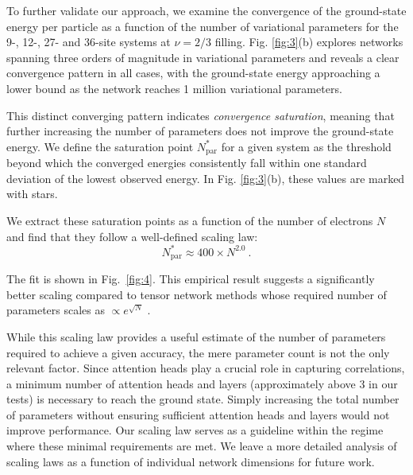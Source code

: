 \documentclass[
 reprint,
 amsmath,amssymb,
 aps, prx,
floatfix,longbibliography,
]{revtex4-2}
\begin{document}
To further validate our approach, we examine the convergence of the ground-state energy per particle as a function of the number of variational parameters for the 9-, 12-, 27- and 36-site systems at 
$\nu=2/3$ filling. Fig. \ref{fig:3}(b) explores networks spanning three orders of magnitude in variational parameters and reveals a clear convergence pattern in all cases, with the ground-state energy approaching a lower bound as the network reaches 1 million variational parameters.

This distinct converging pattern indicates \textit{convergence saturation}, meaning that further increasing the number of parameters does not improve the ground-state energy. We define the saturation point 
$N^*_{\text{par}}$ for a given system as the threshold beyond which the converged energies consistently fall within one standard deviation of the lowest observed energy. In Fig. \ref{fig:3}(b), these values are marked with stars.

We extract these saturation points as a function of the number of electrons $N$ and find that they follow a well-defined scaling law:
\begin{equation} 
N_\text{par}^* \approx 400 \times N^{2.0} \ .
\end{equation}

The fit is shown in Fig.~\ref{fig:4}.
This empirical result suggests a significantly better scaling compared to tensor network methods whose required number of parameters scales as $\propto e^{\sqrt{N}}$ \cite{Ganahl2023Feb}.


While this scaling law provides a useful estimate of the number of parameters required to achieve a given accuracy, the mere parameter count is not the only relevant factor. Since attention heads play a crucial role in capturing correlations, a minimum number of attention heads and layers (approximately above 3 in our tests) is necessary to reach the ground state. Simply increasing the total number of parameters without ensuring sufficient attention heads and layers would not improve performance. Our scaling law serves as a guideline within the regime where these minimal requirements are met. We leave a more detailed analysis of scaling laws as a function of individual network dimensions for future work.
\end{document}
